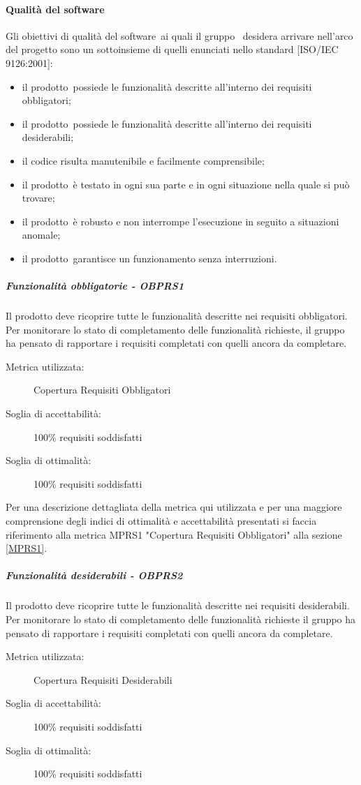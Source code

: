 \documentclass[../PianoDiQualifica.tex]{subfiles}
\begin{document}
			\paragraph{Qualità del software}
			Gli obiettivi di qualità del software\g\ ai quali il gruppo \leaf\ desidera arrivare nell'arco del progetto sono un sottoinsieme di quelli enunciati nello standard [ISO/IEC 9126:2001]:
		\begin{itemize}
			\item il prodotto\g\ possiede le funzionalità descritte all'interno dei requisiti obbligatori;
			\item il prodotto\g\ possiede le funzionalità descritte all'interno dei requisiti desiderabili;
			\item il codice risulta manutenibile e facilmente comprensibile;
			\item il prodotto\g\ è testato in ogni sua parte e in ogni situazione nella quale si può trovare;
			\item il prodotto\g\ è robusto e non interrompe l'esecuzione in seguito a situazioni anomale;
			\item il prodotto\g{}arantisce un funzionamento senza interruzioni.
		\end{itemize}
				\subparagraph{Funzionalità obbligatorie - OBPRS1}
				Il prodotto deve ricoprire tutte le funzionalità descritte nei requisiti obbligatori. Per monitorare lo stato di completamento delle funzionalità richieste, il gruppo ha pensato di rapportare i requisiti completati con quelli ancora da completare.
					\begin{description}
						\item [Metrica utilizzata:] Copertura Requisiti Obbligatori
						\item [Soglia di accettabilità:] 100\% requisiti soddisfatti
						\item [Soglia di ottimalità:] 100\% requisiti soddisfatti
					\end{description}
					Per una descrizione dettagliata della metrica qui utilizzata e per una maggiore comprensione degli indici di ottimalità e accettabilità presentati si faccia riferimento alla metrica MPRS1 "Copertura Requisiti Obbligatori" alla sezione \ref{MPRS1}.
				\subparagraph{Funzionalità desiderabili - OBPRS2}	
				Il prodotto deve ricoprire tutte le funzionalità descritte nei requisiti desiderabili. Per monitorare lo stato di completamento delle funzionalità richieste il gruppo ha pensato di rapportare i requisiti completati con quelli ancora da completare.
					\begin{description}
						\item [Metrica utilizzata:] Copertura Requisiti Desiderabili
						\item [Soglia di accettabilità:] 100\% requisiti soddisfatti
						\item [Soglia di ottimalità:] 100\% requisiti soddisfatti
					\end{description}
\end{document}
